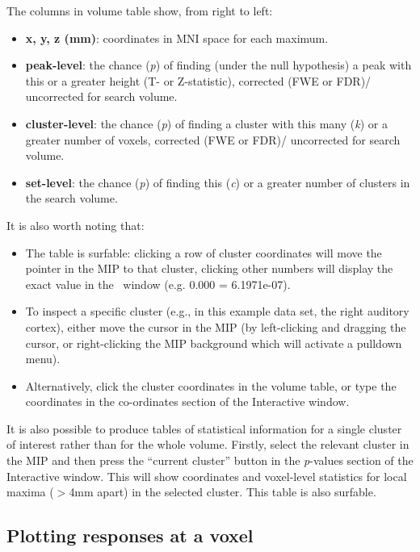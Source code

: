 The columns in volume table show, from right to left:

\begin{itemize}
\item \textbf{x, y, z (mm)}: coordinates in MNI space for each maximum.
\item \textbf{peak-level}: the chance (\textit{p}) of finding (under the null hypothesis) a peak with this or a greater height (T- or Z-statistic), corrected (FWE or FDR)/ uncorrected for search volume.
\item \textbf{cluster-level}: the chance (\textit{p}) of finding a cluster with this many (\textit{k}) or a greater number of voxels, corrected (FWE or FDR)/ uncorrected for search volume.
\item \textbf{set-level}: the chance (\textit{p}) of finding this (\textit{c}) or a greater number of clusters in the search volume.
\end{itemize}

It is also worth noting that:

\begin{itemize}
\item The table is surfable: clicking a row of cluster coordinates will move the pointer in the MIP to that cluster, clicking other numbers will display the exact value in the \matlab\ window (e.g. 0.000 = 6.1971e-07).
\item To inspect a specific cluster (e.g., in this example data set, the right auditory cortex), either move the cursor in the MIP (by left-clicking and dragging the cursor, or right-clicking the MIP background which will activate a pulldown menu).
\item Alternatively, click the cluster coordinates in the volume table, or type the coordinates in the co-ordinates section of the Interactive window.
\end{itemize}

It is also possible to produce tables of statistical information for a single cluster of interest rather than for the whole volume. Firstly, select the relevant cluster in the MIP and then press the ``current cluster'' button in the \textit{p}-values section of the Interactive window. This will show coordinates and voxel-level statistics for local maxima ($>$4mm apart) in the selected cluster. This table is also surfable.

\subsection{Plotting responses at a voxel}

